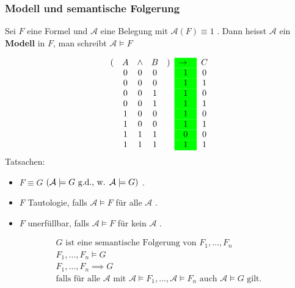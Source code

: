 \subsubsection{Modell und semantische Folgerung}
\begin{def*}[note = Modell , index = Modell]
	Sei $F$ eine Formel und $\mathcal{A}$ eine Belegung mit $\mathcal{A}( F ) \equiv 1$ . Dann heisst $\mathcal{A}$ ein \textbf{Modell} in $F$, man schreibt $\mathcal{A} \models F$
\end{def*}
\begin{bsp*}
	\begin{gather*}
		\begin{array}{ c c c c c >{\columncolor{green}}c c }
			(	& A	& \wedge	& B	& )	& \rightarrow	& C	\\
				& 0	& 0		& 0	&	& 1			& 0	\\
				& 0	& 0		& 0	&	& 1			& 1	\\
				& 0	& 0		& 1	&	& 1			& 0	\\
				& 0	& 0		& 1	&	& 1			& 1	\\
				& 1	& 0		& 0	&	& 1			& 0	\\
				& 1	& 0		& 0	&	& 1			& 1	\\
				& 1	& 1		& 1	&	& 0			& 0	\\
				& 1	& 1		& 1	&	& 1			& 1	
		\end{array}
	\end{gather*}
	Tatsachen:
	\begin{itemize}
		\item $F \equiv G$ \gdw $( \mathcal{A} \models G \text{ g.d., w. } \mathcal{A} \models G )$ .
		\item $F$ Tautologie, falls $\mathcal{A} \models F$ für alle $\mathcal{A}$ .
		\item $F$ unerfüllbar, falls $\mathcal{A} \models F$ für kein $\mathcal{A}$ .
	\end{itemize}
\end{bsp*}
\begin{def*}[note = semantische Folgerung , index = semantische Folgerung]
	\begin{gather*}
		G \text{ ist eine semantische Folgerung von } F_1 , \dotsc , F_n \\
		F_1 , \dotsc , F_n \models G \\
		F_1 , \dotsc , F_n \implies G \\
		\text{falls für alle } \mathcal{A} \text{ mit } \mathcal{A} \models F_1 , \dotsc , \mathcal{A} \models F_n \text{ auch } \mathcal{A} \models G \text{ gilt.}
	\end{gather*}
\end{def*}
